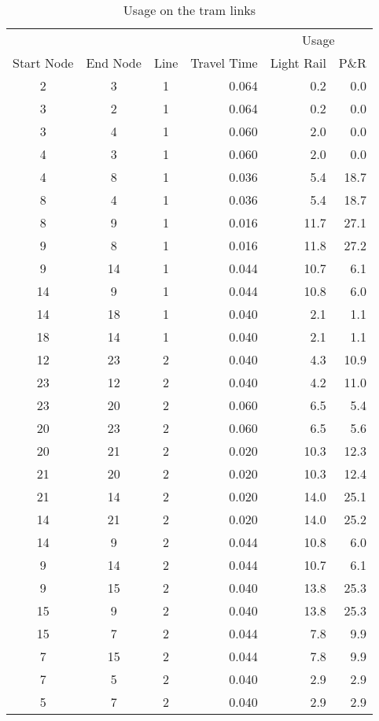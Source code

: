 \begin{table}
    \centering
    \begin{tabular}{cccr|rr}
    \toprule
    \multicolumn{4}{r|}{} & \multicolumn{2}{c}{Usage} \\
    Start Node & End Node & Line & Travel Time & Light Rail & P\&R \\
    \midrule
    2 & 3 & 1 & 0.064 & 0.2 & 0.0 \\
    3 & 2 & 1 & 0.064 & 0.2 & 0.0 \\
    3 & 4 & 1 & 0.060 & 2.0 & 0.0 \\
    4 & 3 & 1 & 0.060 & 2.0 & 0.0 \\
    4 & 8 & 1 & 0.036 & 5.4 & 18.7 \\
    8 & 4 & 1 & 0.036 & 5.4 & 18.7 \\
    8 & 9 & 1 & 0.016 & 11.7 & 27.1 \\
    9 & 8 & 1 & 0.016 & 11.8 & 27.2 \\
    9 & 14 & 1 & 0.044 & 10.7 & 6.1 \\
    14 & 9 & 1 & 0.044 & 10.8 & 6.0 \\
    14 & 18 & 1 & 0.040 & 2.1 & 1.1 \\
    18 & 14 & 1 & 0.040 & 2.1 & 1.1 \\
    12 & 23 & 2 & 0.040 & 4.3 & 10.9 \\
    23 & 12 & 2 & 0.040 & 4.2 & 11.0 \\
    23 & 20 & 2 & 0.060 & 6.5 & 5.4 \\
    20 & 23 & 2 & 0.060 & 6.5 & 5.6 \\
    20 & 21 & 2 & 0.020 & 10.3 & 12.3 \\
    21 & 20 & 2 & 0.020 & 10.3 & 12.4 \\
    21 & 14 & 2 & 0.020 & 14.0 & 25.1 \\
    14 & 21 & 2 & 0.020 & 14.0 & 25.2 \\
    14 & 9 & 2 & 0.044 & 10.8 & 6.0 \\
    9 & 14 & 2 & 0.044 & 10.7 & 6.1 \\
    9 & 15 & 2 & 0.040 & 13.8 & 25.3 \\
    15 & 9 & 2 & 0.040 & 13.8 & 25.3 \\
    15 & 7 & 2 & 0.044 & 7.8 & 9.9 \\
    7 & 15 & 2 & 0.044 & 7.8 & 9.9 \\
    7 & 5 & 2 & 0.040 & 2.9 & 2.9 \\
    5 & 7 & 2 & 0.040 & 2.9 & 2.9 \\
    \bottomrule
    \end{tabular}
    \caption{Usage on the tram links}
\end{table}
